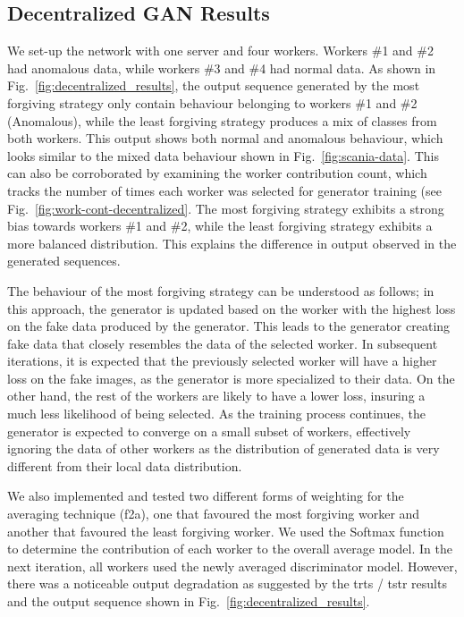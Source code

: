 \subsection{Decentralized GAN Results}
%
We set-up the network with one server and four workers. Workers \#1 and \#2 had anomalous data, while workers \#3 and \#4 had normal data.
As shown in Fig.~\ref{fig:decentralized_results}, the output sequence generated by the most forgiving strategy only contain behaviour belonging to workers \#1 and \#2 (Anomalous), while the least forgiving strategy produces a mix of classes from both workers. This output shows both normal and anomalous behaviour, which looks similar to the mixed data behaviour shown in Fig.~\ref{fig:scania-data}. This can also be corroborated by examining the worker contribution count, which tracks the number of times each worker was selected for generator training (see Fig.~\ref{fig:work-cont-decentralized}. The most forgiving strategy exhibits a strong bias towards workers \#1 and \#2, while the least forgiving strategy exhibits a more balanced distribution. This explains the difference in output observed in the generated sequences.



The behaviour of the most forgiving strategy can be understood as follows; in this approach, the generator is updated based on the worker with the highest loss on the fake data produced by the generator. This leads to the generator creating fake data that closely resembles the data of the selected worker. In subsequent iterations, it is expected that the previously selected worker will have a higher loss on the fake images, as the generator is more specialized to their data. On the other hand, the rest of the workers are likely to have a lower loss, insuring a much less likelihood of being selected. As the training process continues, the generator is expected to converge on a small subset of workers, effectively ignoring the data of other workers as the distribution of generated data is very different from their local data distribution. 

We also implemented and tested two different forms of weighting for the averaging technique (\gls*{f2a}), one that favoured the most forgiving worker and another that favoured the least forgiving worker. We used the Softmax function to determine the contribution of each worker to the overall average model. In the next iteration, all workers used the newly averaged discriminator model. However, there was a noticeable output degradation as suggested by the \gls*{trts} / \gls*{tstr} results and the output sequence shown in Fig.~\ref{fig:decentralized_results}.
%

%

%
%




